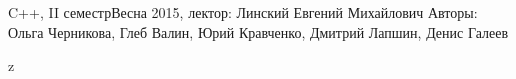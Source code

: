 


\BigHeader
	{C++, II семестр}{Весна 2015, лектор: Линский Евгений Михайлович}
	{Авторы: Ольга Черникова, Глеб Валин, Юрий Кравченко, Дмитрий Лапшин, Денис Галеев}

 





z


